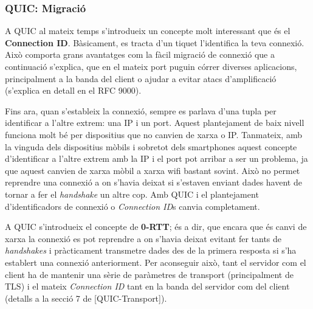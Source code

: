 \subsubsection{QUIC: Migració}
{
    A QUIC al mateix temps s'introdueix un concepte molt interessant que és el \textbf{Connection ID}. Bàsicament, es tracta d'un tiquet l'identifica la teva connexió. Això comporta grans avantatges com la fàcil migració de connexió que a continuació s'explica, que en el
    mateix port puguin córrer diverses aplicacions, principalment a la banda del client o ajudar a evitar atacs d'amplificació (s'explica
    en detall en el RFC 9000).

    Fins ara, quan s'estableix la connexió, sempre es parlava d'una tupla per identificar a l'altre extrem: una IP i un port. Aquest
    plantejament de baix nivell funciona molt bé per dispositius que no canvien de xarxa o IP. Tanmateix, amb la vinguda dels dispositius
    mòbils i sobretot dels smartphones aquest concepte d'identificar a l'altre extrem amb la IP i el port pot arribar a ser un problema, ja
    que aquest canvien de xarxa mòbil a xarxa wifi bastant sovint. Això no permet reprendre una connexió a on s'havia deixat si s'estaven enviant
    dades havent de tornar a fer el \textit{handshake} un altre cop. Amb QUIC i el plantejament d'identificadors de connexió o
    \textit{Connection ID}s canvia completament.

    A QUIC s'introdueix el concepte de \textbf{0-RTT}; és a dir, que encara que és canvi de xarxa la connexió es pot reprendre a on s'havia deixat
    evitant fer tants de \textit{handshakes} i pràcticament transmetre dades des de la primera resposta si s'ha establert una connexió anteriorment.
    Per aconseguir això, tant el servidor com el client ha de mantenir una sèrie de paràmetres de transport (principalment de TLS) i el mateix
    \textit{Connection ID} tant en la banda del servidor com del client (detalls a la secció 7 de [QUIC-Transport]).
    
}

